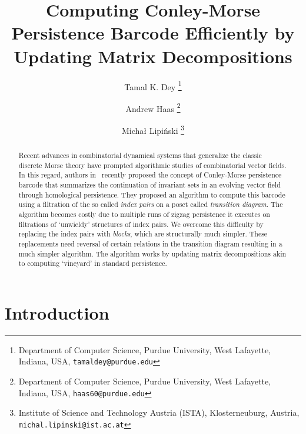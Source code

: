 \documentclass[letterpaper,11pt]{article}
\title{Computing Conley-Morse Persistence Barcode Efficiently by Updating Matrix Decompositions}
\author{Tamal K. Dey \thanks{Department of Computer Science, Purdue University, West Lafayette, Indiana, USA, \texttt{tamaldey@purdue.edu}}
 \and 
    Andrew Haas \thanks{Department of Computer Science, Purdue University, West Lafayette, Indiana, USA, \texttt{haas60@purdue.edu}}
\and
    Micha\l{} Lipi\'nski \thanks{Institute of Science and Technology Austria (ISTA), Klosterneuburg, Austria, \texttt{michal.lipinski@ist.ac.at}}}
\theoremstyle{plain}
\theoremstyle{definition}
\newcounter{li}
\begin{document}
\maketitle

\begin{abstract}
Recent advances in combinatorial dynamical systems that generalize the classic
discrete Morse theory have prompted algorithmic studies of combinatorial vector fields. In this regard, authors in~\cite{CMbarcodes2025} recently proposed the concept of
Conley-Morse persistence barcode that summarizes the continuation of invariant sets in an evolving vector field through homological persistence. 
They proposed an algorithm to compute this barcode using a filtration of the so called \emph{index pairs} on a poset called \emph{transition diagram}. 
The algorithm becomes costly due to multiple runs of zigzag persistence it executes on filtrations of `unwieldy' structures of index pairs. We overcome this difficulty by replacing the index pairs with \emph{blocks},
    which are structurally much simpler. 
These replacements need reversal of certain relations in the
transition diagram resulting in a much simpler algorithm.
The algorithm works by updating matrix decompositions
akin to computing `vineyard' in standard persistence.



\end{abstract}

\newpage

\section{Introduction}
\end{document}

